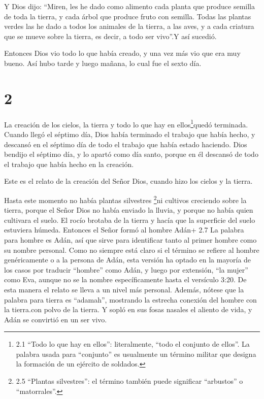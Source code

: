  Y Dios dijo: ``Miren, les he dado como alimento cada
planta que produce semilla de toda la tierra, y cada árbol que produce
fruto con semilla.  Todas las plantas verdes las he dado a
todos los animales de la tierra, a las aves, y a cada criatura que se
mueve sobre la tierra, es decir, a todo ser vivo''.Y así sucedió.

 Entonces Dios vio todo lo que había creado, y una vez más
vio que era muy bueno. Así hubo tarde y luego mañana, lo cual fue el
sexto día.

\hypertarget{section-1}{%
\section{2}\label{section-1}}

 La creación de los cielos, la tierra y todo lo que hay en
ellos\footnote{2.1 ``Todo lo que hay en ellos'': literalmente, ``todo el
  conjunto de ellos''. La palabra usada para ``conjunto'' es usualmente
  un término militar que designa la formación de un ejército de
  soldados.}quedó terminada.  Cuando llegó el séptimo día,
Dios había terminado el trabajo que había hecho, y descansó en el
séptimo día de todo el trabajo que había estado haciendo. 
Dios bendijo el séptimo día, y lo apartó como día santo, porque en él
descansó de todo el trabajo que había hecho en la creación.

 Este es el relato de la creación del Señor Dios, cuando
hizo los cielos y la tierra.

 Hasta este momento no había plantas silvestres
\footnote{2.5 ``Plantas silvestres'': el término también puede
  significar ``arbustos'' o ``matorrales''.}ni cultivos creciendo sobre
la tierra, porque el Señor Dios no había enviado la lluvia, y porque no
había quien cultivara el suelo.  El rocío brotaba de la
tierra y hacía que la superficie del suelo estuviera húmeda.
 Entonces el Señor formó al hombre Adán+ 2.7 La palabra para
hombre es Adán, así que sirve para identificar tanto al primer hombre
como su nombre personal. Como no siempre está claro si el término se
refiere al hombre genéricamente o a la persona de Adán, esta versión ha
optado en la mayoría de los casos por traducir ``hombre'' como Adán, y
luego por extensión, ``la mujer'' como Eva, aunque no se la nombre
específicamente hasta el versículo 3:20. De esta manera el relato se
lleva a un nivel más personal. Además, nótese que la palabra para tierra
es ``adamah'', mostrando la estrecha conexión del hombre con la
tierra.con polvo de la tierra. Y sopló en sus fosas nasales el aliento
de vida, y Adán se convirtió en un ser vivo.

